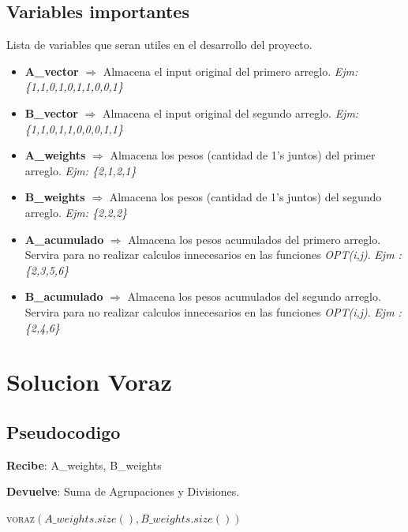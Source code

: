 \documentclass[12pt]{article}
\newcommand{\TITLE}[1]{\item[#1]}
\begin{document}
\subsection{Variables importantes}
Lista de variables que seran utiles en el desarrollo del proyecto.\\

\begin{itemize}
		\item \textbf{A\_vector} $\Rightarrow$ Almacena el input original del primero arreglo. \textit{Ejm: \{1,1,0,1,0,1,1,0,0,1\}}
		\item \textbf{B\_vector} $\Rightarrow$ Almacena el input original del segundo arreglo. \textit{Ejm: \{1,1,0,1,1,0,0,0,1,1\}}
		\item \textbf{A\_weights} $\Rightarrow$ Almacena los pesos (cantidad de 1's juntos) del primer arreglo. \textit{Ejm: \{2,1,2,1\}}
		\item \textbf{B\_weights} $\Rightarrow$ Almacena los pesos (cantidad de 1's juntos) del segundo arreglo. \textit{Ejm: \{2,2,2\}}
		\item \textbf{A\_acumulado} $\Rightarrow$ Almacena los pesos acumulados del primero arreglo. Servira para no realizar calculos innecesarios en las funciones \textit{OPT(i,j)}. \textit{Ejm :\{2,3,5,6\}}
		\item \textbf{B\_acumulado} $\Rightarrow$ Almacena los pesos acumulados del segundo arreglo. Servira para no realizar calculos innecesarios en las funciones \textit{OPT(i,j)}. \textit{Ejm :\{2,4,6\}}
\end{itemize}



\newpage



\section{Solucion Voraz}

\subsection{Pseudocodigo}

\textbf{Recibe}: A\_weights, B\_weights

\textbf{Devuelve}: Suma de Agrupaciones y Divisiones. \\
\begin{algorithmic}[1]
		\TITLE{\textsc{Voraz\_func}$(A\_weights,B\_weights)$}
	
  \RETURN \textsc{voraz}$(A\_weights.size(),B\_weights.size())$
  
  \end{algorithmic}
\end{document}
